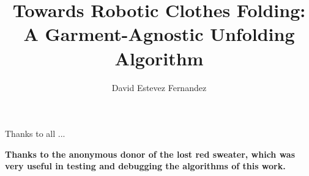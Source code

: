 \documentclass[11pt,a4paper,twoside]{book}
\newcommand{\warning}[1]{\textbf{\color{red} #1}}
\begin{document}
	\title{\textbf{Towards Robotic Clothes Folding:\\A Garment-Agnostic Unfolding Algorithm}}
	\author{David Estevez Fernandez}

		

    \beforepreface

		Thanks to all ...
   
   		\warning{Thanks to the anonymous donor of the lost red sweater, which was very useful in testing and debugging the algorithms of this work.}

		
		
		


	\cleardoublepage
    	\afterpreface

	\pagestyle{fancyplain}
	\renewcommand{\chaptermark}[1] %
	{\markboth{#1}{\thechapter\ #1}}
	\renewcommand{\sectionmark}[1]%
	{\markright{\thesection\ #1}}
	\lhead[\fancyplain{}{\bfseries\thepage}]
	{\fancyplain{}{\bfseries\rightmark}}
	\rhead[\fancyplain{}{\bfseries\leftmark}] {\fancyplain{}{\bfseries\thepage}}
	\cfoot{}
	
	
	
	
	
	
	
	
	



		
\end{document}
